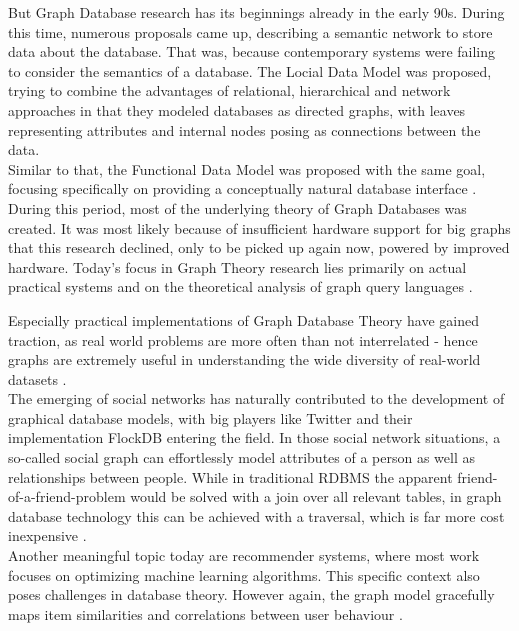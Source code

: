 But Graph Database research has its beginnings already in the early 90s. During this time, numerous proposals came up, describing a semantic network to store data about the database. That was, because contemporary systems were failing to consider the semantics of a database.
The Locial Data Model \autocite{KUPERLDM} was proposed, trying to combine the advantages of relational, hierarchical and network approaches in that they modeled databases as directed graphs, with leaves representing attributes and internal nodes posing as connections between the data. \\
Similar to that, the Functional Data Model \autocite{Shipman1979} was proposed with the same goal, focusing specifically on providing a conceptually natural database interface \autocite{Angles2018AnIT}. \\
During this period, most of the underlying theory of Graph Databases was created.
It was most likely because of insufficient hardware support for big graphs that this research declined, only to be picked up again now, powered by improved hardware. Today's focus in Graph Theory research lies primarily on actual practical systems and on the theoretical analysis of graph query languages \autocite{Angles2018AnIT}.

Especially practical implementations of Graph Database Theory have gained traction, as real world problems are more often than not interrelated - hence graphs are extremely useful in understanding the wide diversity of real-world datasets \autocite{Robinson2013}. \\
The emerging of social networks has naturally contributed to the development of graphical database models, with big players like Twitter and their implementation FlockDB entering the field. In those social network situations, a so-called social graph can effortlessly model attributes of a person as well as relationships between people. While in traditional RDBMS the apparent friend-of-a-friend-problem would be solved with a join over all relevant tables, in graph database technology this can be achieved with a traversal, which is far more cost inexpensive \autocite{Miller2013GraphDA}. \\
Another meaningful topic today are recommender systems, where most work focuses on optimizing machine learning algorithms. This specific context also poses challenges in database theory. However again, the graph model gracefully maps item similarities and correlations between user behaviour \autocite{Huang2002}.

